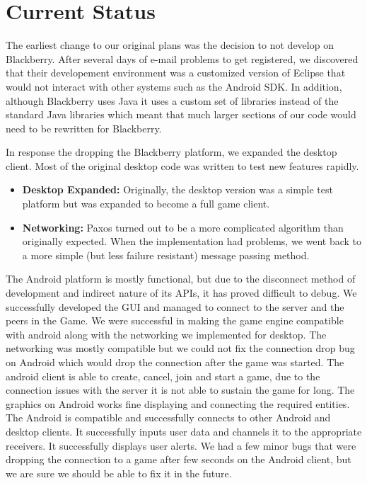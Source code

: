 \documentclass{sig-alternate}
\begin{document}
\section{Current Status}
\label{status}

The earliest change to our original plans was the decision to not develop
on Blackberry.  After several days of e-mail problems to get registered, we
discovered that their developement environment was a customized version of
Eclipse that would not interact with other systems such as the Android SDK.
In addition, although Blackberry uses Java it uses a custom set of
libraries instead of the standard Java libraries which meant that much
larger sections of our code would need to be rewritten for Blackberry.

In response the dropping the Blackberry platform, we expanded the desktop
client.  Most of the original desktop code was written to test new features
rapidly.

\begin{itemize}
	\item \textbf{Desktop Expanded:} Originally, the desktop version was a
		simple test platform but was expanded to become a full game client.
	\item \textbf{Networking:} Paxos turned out to be a more complicated
		algorithm than originally expected.  When the implementation had
		problems, we went back to a more simple (but less failure
		resistant) message passing method.
\end{itemize}

The Android platform is mostly functional, but due to the disconnect method
of development and indirect nature of its APIs, it has proved difficult to
debug.  We successfully developed the GUI and managed to connect to the
server and the peers in the Game.  We were successful in making the game
engine compatible with android along with the networking we implemented for
desktop.  The networking was mostly compatible but we could not fix the
connection drop bug on Android which would drop the connection after the
game was started.  The android client is able to create, cancel, join and
start a game, due to the connection issues with the server it is not able
to sustain the game for long.  The graphics on Android works fine
displaying and connecting the required entities.  The Android is compatible
and successfully connects to other Android and desktop clients.  It
successfully inputs user data and channels it to the appropriate receivers.
It successfully displays user alerts.  We had a few minor bugs that were
dropping the connection to a game after few seconds on the Android client,
but we are sure we should be able to fix it in the future.
\end{document}
